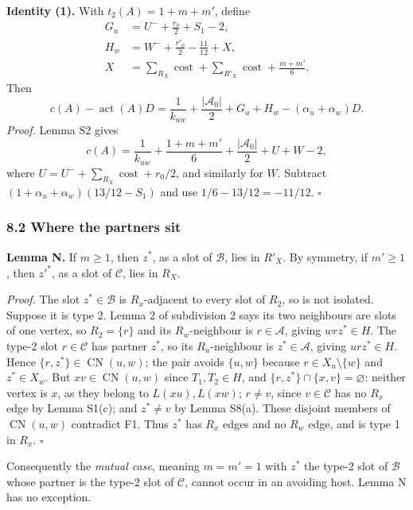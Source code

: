 \textbf{Identity (1).} With $t_2(A)=1+m+m'$, define
\begin{align*}
 G_u&=U^-+\frac{r_0}2+S_1-2,\\
 H_w&=W^-+\frac{r'_0}2-\frac{11}{12}+X,\\
 X&=\sum_{R_X}\operatorname{cost}+\sum_{R'_X}\operatorname{cost}
       +\frac{m+m'}6.
\end{align*}
Then
\[
 c(A)-\operatorname{act}(A)D
 =\frac1{k_{uw}}+\frac{|\mathcal A_0|}2+G_u+H_w-(\alpha_u+\alpha_w)D.
 \tag{1}
\]
\emph{Proof.} Lemma S2 gives
\[
 c(A)=\frac1{k_{uw}}+\frac{1+m+m'}6+\frac{|\mathcal A_0|}2+U+W-2,
\]
where $U=U^-+\sum_{R_X}\operatorname{cost}+r_0/2$, and similarly for $W$.
Subtract $(1+\alpha_u+\alpha_w)(13/12-S_1)$ and use $1/6-13/12=-11/12$.
\hfill$\square$

\subsubsection*{8.2 Where the partners sit}
\textbf{Lemma N.} If $m\ge1$, then $z^*$, as a slot of $\mathcal B$, lies in $R'_X$.
By symmetry, if $m'\ge1$, then $z'^*$, as a slot of $\mathcal C$, lies in $R_X$.

\emph{Proof.} The slot $z^*\in\mathcal B$ is $R_x$-adjacent to every slot of $R_2$, so is not isolated. Suppose it is type 2. Lemma 2 of subdivision 2 says its two neighbours are slots of one vertex, so $R_2=\{r\}$ and its $R_w$-neighbour is $r\in\mathcal A$, giving $wrz^*\in H$. The type-2 slot $r\in\mathcal C$ has partner $z^*$, so its $R_u$-neighbour is $z^*\in\mathcal A$, giving $urz^*\in H$. Hence $\{r,z^*\}\in\operatorname{CN}(u,w)$; the pair avoids $\{u,w\}$ because $r\in X_u\setminus\{w\}$ and $z^*\in X_w$.
But $xv\in\operatorname{CN}(u,w)$ since $T_1,T_2\in H$, and
$\{r,z^*\}\cap\{x,v\}=\varnothing$: neither vertex is $x$, as they belong to $L(xu),L(xw)$; $r\ne v$, since $v\in\mathcal C$ has no $R_x$ edge by Lemma S1(c); and $z^*\ne v$ by Lemma S8(a). These disjoint members of $\operatorname{CN}(u,w)$ contradict F1. Thus $z^*$ has $R_x$ edges and no $R_w$ edge, and is type 1 in $R_x$.
\hfill$\square$

Consequently the \emph{mutual case}, meaning $m=m'=1$ with $z^*$ the type-2 slot of $\mathcal B$ whose partner is the type-2 slot of $\mathcal C$, cannot occur in an avoiding host. Lemma N has no exception.

